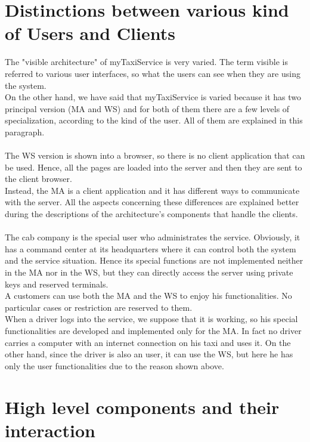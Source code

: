 \documentclass[\mainpath/main]{subfiles}
\begin{document}
\section{Distinctions between various kind of Users and Clients}
\label{ArchitecturalDesign:preamble}
The "visible architecture" of myTaxiService is very varied. The term visible is referred to various user interfaces, so what the users can see when they are using the system.\\
On the other hand, we have said that myTaxiService is varied because it has two principal version (MA and WS) and for both of them there are a few levels of specialization, according to the kind of the user. All of them are explained in this paragraph.\\
\\
The WS version is shown into a browser, so there is no client application that can be used. Hence, all the pages are loaded into the server and then they are sent to the client browser.\\
Instead, the MA is a client application and it has different ways to communicate with the server. All the aspects concerning these differences are explained better during the descriptions of the architecture's components that handle the clients.\\
\\
The cab company is the special user who administrates the service. Obviously, it has a command center at its headquarters where it can control both the system and the service situation. Hence its special functions are not implemented neither in the MA nor in the WS, but they can directly access the server using private keys and reserved terminals.\\
A customers can use both the MA and the WS to enjoy his functionalities. No particular cases or restriction are reserved to them.\\
When a driver logs into the service, we suppose that it is working, so his special functionalities are developed and implemented only for the MA. In fact no driver carries a computer with an internet connection on his taxi and uses it. On the other hand, since the driver is also an user, it can use the WS, but here he has only the user functionalities due to the reason shown above.\\



\section{High level components and their interaction}
\label{ArchitecturalDesign:high_level}
\end{document}
